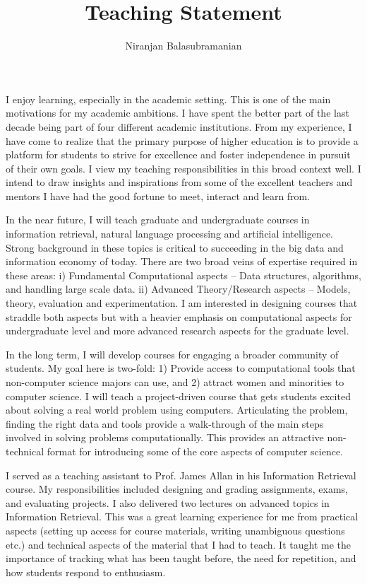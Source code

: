 \documentclass[a4paper,11pt,onecolumn]{article}
\begin{document}

\title{Teaching Statement}
\author{Niranjan Balasubramanian}
\maketitle

I enjoy learning, especially in the academic setting. This is one of the main motivations for my academic ambitions. I have spent the better part of the last decade being part of four different academic institutions. From my experience, I have come to realize that the primary purpose of higher education is to provide a platform for students 
to strive for excellence and foster independence in pursuit of their own goals. I view my teaching responsibilities in this broad context well. I intend to draw insights and inspirations from some of the excellent teachers and mentors I have had the good fortune to meet, interact and learn from.

In the near future, I will teach graduate and undergraduate courses in information retrieval, natural language processing and artificial intelligence. Strong background in these topics is critical to succeeding in the big data and information economy of today. There are two broad veins of expertise required in these areas: i) Fundamental Computational aspects -- Data structures, algorithms, and handling large scale data. ii) Advanced Theory/Research aspects -- Models, theory, evaluation and experimentation. I am interested in designing courses that straddle both aspects but with a heavier emphasis on computational aspects for undergraduate level and more advanced research aspects for the graduate level.

In the long term, I will develop courses for engaging a broader community of students. My goal here is two-fold: 1) Provide access to computational tools that non-computer science majors can use, and 2) attract women and minorities to computer science. I will teach a project-driven course that gets students excited about solving a real world problem using computers. Articulating the problem, finding the right data and tools provide a walk-through of the main steps involved in solving problems computationally. This provides an attractive non-technical format for introducing some of the core aspects of computer science. 

I served as a teaching assistant to Prof. James Allan in his Information Retrieval course. My responsibilities included designing and grading assignments, exams, and evaluating projects. I also delivered two lectures on advanced topics in Information Retrieval. This was a great learning experience for me from practical aspects (setting up access for course materials, writing unambiguous questions etc.) and technical aspects of the material that I had to teach. It taught me the importance of tracking what has been taught before, the need for repetition, and how students respond to enthusiasm.
\end{document}
